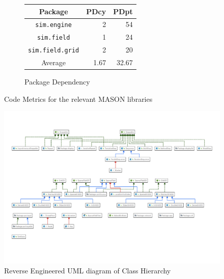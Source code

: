 \documentclass[11pt]{article}
\begin{document}
\begin{figure}[htp]
\par\bigskip

\begin{subfigure}[b]{\textwidth}
\begin{center}
\begin{tabular}{|c|r|r|}
	\hline
	\textbf{Package} & \textbf{PDcy} & \textbf{PDpt} \\
	\hline
	\texttt{sim.engine} & 2 & 54 \\
	\texttt{sim.field} & 1 & 24 \\
	\texttt{sim.field.grid} & 2 & 20 \\
	\hline
	Average & 1.67 & 32.67 \\
	\hline
\end{tabular}
\end{center}
\caption{Package Dependency}
\label{fig:dependency}
\end{subfigure}

\caption{Code Metrics for the relevant MASON libraries}
\label{fig:metrics}
\end{figure}

\begin{figure}[htp]
\centering
\includegraphics[width=\textwidth]{Appendix/UML}
\caption{Reverse Engineered UML diagram of Class Hierarchy}
\label{fig:uml}
\end{figure}
\end{document}

